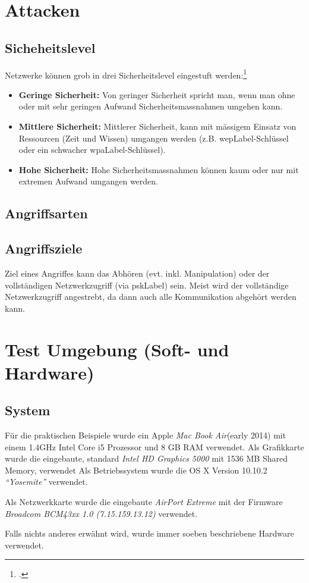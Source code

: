 \section{Attacken}

\subsection{Sicheheitslevel}
Netzwerke können grob in drei Sicherheitslevel eingestuft werden:\footcite[][115]{WrightCache201503}
\begin{itemize}
	\item \textbf{Geringe Sicherheit:} Von geringer Sicherheit spricht man, wenn man ohne oder mit sehr geringen Aufwand Sicherheitsmassnahmen umgehen kann.
	\item \textbf{Mittlere Sicherheit:} Mittlerer Sicherheit, kann mit mässigem Einsatz von Ressourcen (Zeit und Wissen) umgangen werden (z.B. \gls{wepLabel}-Schlüssel oder ein schwacher \gls{wpaLabel}-Schlüssel).
	\item \textbf{Hohe Sicherheit:} Hohe Sicherheitsmassnahmen können kaum oder nur mit extremen Aufwand umgangen werden.
\end{itemize}

\subsection{Angriffsarten}

\subsection{Angriffsziele}
Ziel eines Angriffes kann das Abhören (evt. inkl. Manipulation) oder der vollständigen Netzwerkzugriff (via \gls{pskLabel}) sein.
Meist wird der vollständige Netzwerkzugriff angestrebt, da dann auch alle Kommunikation abgehört werden kann.

\section{Test Umgebung (Soft- und Hardware)}
\label{sec:testEnvroiment}
\subsection{System}
Für die praktischen Beispiele wurde ein Apple \textit{Mac Book Air}(early 2014) mit einem 1.4GHz Intel Core i5 Prozessor und 8 GB RAM verwendet. Als Grafikkarte wurde die eingebaute, standard \textit{Intel HD Graphics 5000} mit 1536 MB Shared Memory, verwendet
Als Betriebssystem wurde die OS X Version 10.10.2 \textit{"`Yosemite"'} verwendet.

Als Netzwerkkarte wurde die eingebaute \textit{AirPort Extreme} mit der Firmware \textit{Broadcom BCM43xx 1.0 (7.15.159.13.12)} verwendet.

Falls nichts anderes erwähnt wird, wurde immer soeben beschriebene Hardware verwendet.
